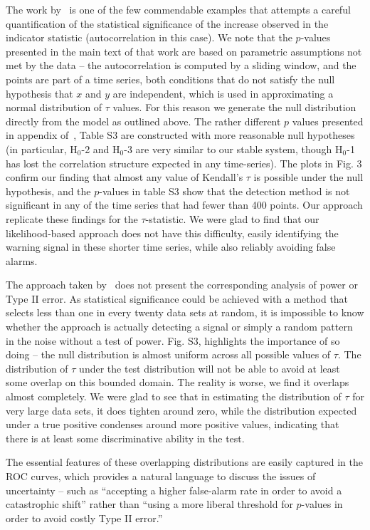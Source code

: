 \documentclass[11pt]{elsarticle}
\begin{document}
The work by~\citet{Dakos2008} is one of the few commendable examples that attempts a careful quantification of the statistical significance of the increase observed in the indicator statistic (autocorrelation in this case).  We note that the $p$-values presented in the main text of that work are based on parametric assumptions not met by the data -- the autocorrelation is computed by a sliding window, and the points are part of a time series, both conditions that do not satisfy the null hypothesis that $x$ and $y$ are independent, which is used in approximating a normal distribution of $\tau$ values.  For this reason we generate the null distribution directly from the model as outlined above.   The rather different $p$ values presented in appendix of~\citet{Dakos2008}, Table S3 are constructed with more reasonable null hypotheses (in particular, H$_0$-2 and H$_0$-3 are very similar to our stable system, though H$_0$-1 has lost the correlation structure expected in any time-series).  The plots in Fig. 3 confirm our finding that almost any value of Kendall's $\tau$ is possible under the null hypothesis, and the $p$-values in table S3 show that the detection method is not significant in any of the time series that had fewer than 400 points.  Our approach replicate these findings for the $\tau$-statistic.  We were glad to find that our likelihood-based approach does not have this difficulty, easily identifying the warning signal in these shorter time series, while also reliably avoiding false alarms.  

The approach taken by~\citet{Dakos2008} does not present the corresponding analysis of power or Type II error.  As statistical significance could be achieved with a method that selects less than one in every twenty data sets at random, it is impossible to know whether the approach is actually detecting a signal or simply a random pattern in the noise without a test of power.  Fig. S3, highlights the importance of so doing -- the null distribution is almost uniform across all possible values of $\tau$.  The distribution of $\tau$ under the test distribution will not be able to avoid at least some overlap on this bounded domain.  The reality is worse, we find it overlaps almost completely.  We were glad to see that in estimating the distribution of $\tau$ for very large data sets, it does tighten around zero, while the distribution expected under a true positive condenses around more positive values, indicating that there is at least some discriminative ability in the test. 

The essential features of these overlapping distributions are easily captured in the ROC curves, which provides a natural language to discuss the issues of uncertainty -- such as ``accepting a higher false-alarm rate in order to avoid a catastrophic shift'' rather than ``using a more liberal threshold for $p$-values in order to avoid costly Type II error.''  
\end{document}

